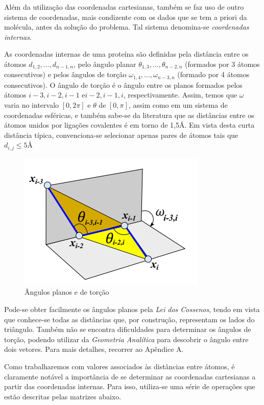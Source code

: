 \documentclass[a4paper,12pt]{article}
\begin{document}
	Além da utilização das coordenadas cartesianas, também se faz uso de outro sistema de coordenadas, mais condizente com os dados que se tem a priori da molécula, antes da solução do problema. Tal sistema denomina-se \textit{coordenadas internas}.
	
	As coordenadas internas de uma proteína são definidas pela distância entre os átomos $d_{1,2}, ..., d_{n - 1,n}$, pelo ângulo planar $\theta_{1,3}, ...,\theta_{n - 2,n}$ (formados por 3 átomos consecutivos) e pelos ângulos de torção $\omega_{1,4}, ..., \omega_{n-3,n}$ (formado por 4 átomos consecutivos). O ângulo de torção é o ângulo entre os planos formados pelos átomos $i-3,i-2,i-1$ e$i-2,i-1,i$, respectivamente. Assim, temos que $\omega$ varia no intervalo $[0,2\pi]$ e $\theta$ de $[0,\pi]$, assim como em um sistema de coordenadas esféricas, e também sabe-se da literatura que as distâncias entre os átomos unidos por ligações covalentes é em torno de 1,5\AA. Em vista desta curta distância típica, convenciona-se selecionar apenas pares de átomos tais que $d_{i,j}\leq 5 $\AA 
	\\
	
	\begin{figure}[H]
		\begin{center}
			\includegraphics[width=0.6\linewidth]{Capturar.PNG}
		\end{center}
		\caption{Ângulos planos e de torção}
		\label{fig:angulos}
	\end{figure}
	
	Pode-se obter facilmente os ângulos planos pela \textit{Lei dos Cossenos}, tendo em vista que conhece-se todas as distâncias que, por construção, representam os lados do triângulo. Também não se encontra dificuldades para determinar os ângulos de torção, podendo utilizar da \textit{Geometria Analítica} para descobrir o ângulo entre dois vetores. Para mais detalhes, recorrer ao Apêndice A.
	
	Como trabalharemos com valores associados às distâncias entre átomos, é claramente notável a importância de se determinar as coordenadas cartesianas a partir das coordenadas internas. Para isso, utiliza-se uma série de operações que estão descritas pelas matrizes abaixo.
	
\end{document}
